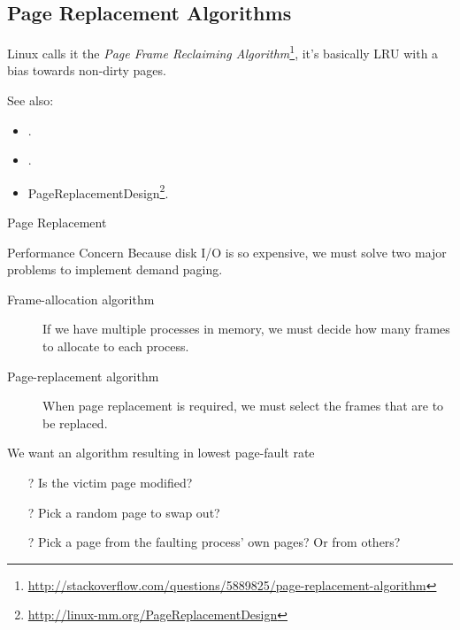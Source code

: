 \subsection{Page Replacement Algorithms}


Linux calls it the \emph{Page Frame Reclaiming
  Algorithm}\footnote{\url{http://stackoverflow.com/questions/5889825/page-replacement-algorithm}},
it's basically LRU with a bias towards non-dirty pages.

See also:
\begin{itemize}
\item {}.
\item {}.
\item PageReplacementDesign\footnote{\url{http://linux-mm.org/PageReplacementDesign}}.
\end{itemize}

\begin{frame}{Page Replacement}
  \begin{iblock}{Performance Concern}
    Because disk I/O is so expensive, we must solve two major problems to implement demand
    paging.
    \begin{description}
    \item[Frame-allocation algorithm] If we have multiple processes in memory, we must
      decide how many frames to allocate to each process.
    \item[Page-replacement algorithm] When page replacement is required, we must select
      the frames that are to be replaced.
    \end{description}
  \end{iblock}
    
  We want an algorithm resulting in lowest page-fault rate
  \begin{itemize}
  \item[?] Is the victim page modified?
  \item[?] Pick a random page to swap out?
  \item[?] Pick a page from the faulting process' own pages? Or from others?
  \end{itemize}
\end{frame}

